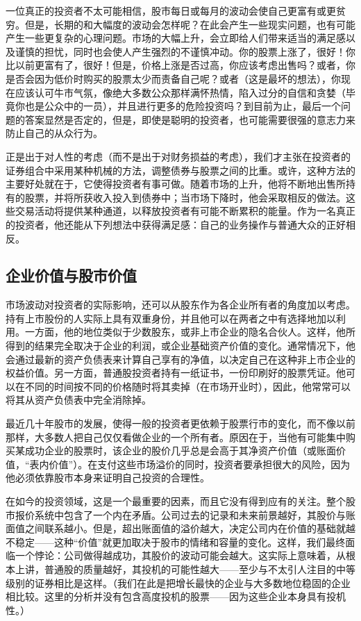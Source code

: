 \documentclass[12pt,oneside]{book}
\begin{document}
一位真正的投资者不太可能相信，股市每日或每月的波动会使自己更富有或更贫穷。但是，长期的和大幅度的波动会怎样呢？在此会产生一些现实问题，也有可能产生一些更复杂的心理问题。市场的大幅上升，会立即给人们带来适当的满足感以及谨慎的担忧，同时也会使人产生强烈的不谨慎冲动。你的股票上涨了，很好！你比以前更富有了，很好！但是，价格上涨是否过高，你应该考虑出售吗？或者，你是否会因为低价时购买的股票太少而责备自己呢？或者（这是最坏的想法），你现在应该认可牛市气氛，像绝大多数公众那样满怀热情，陷入过分的自信和贪婪（毕竟你也是公众中的一员），并且进行更多的危险投资吗？到目前为止，最后一个问题的答案显然是否定的，但是，即使是聪明的投资者，也可能需要很强的意志力来防止自己的从众行为。

正是出于对人性的考虑（而不是出于对财务损益的考虑），我们才主张在投资者的证券组合中采用某种机械的方法，调整债券与股票之间的比重。或许，这种方法的主要好处就在于，它使得投资者有事可做。随着市场的上升，他将不断地出售所持有的股票，并将所获收入投入到债券中；当市场下降时，他会采取相反的做法。这些交易活动将提供某种通道，以释放投资者有可能不断累积的能量。作为一名真正的投资者，他还能从下列想法中获得满足感：自己的业务操作与普通大众的正好相反。

\subsection{企业价值与股市价值}
市场波动对投资者的实际影响，还可以从股东作为各企业所有者的角度加以考虑。持有上市股份的人实际上具有双重身份，并且他可以在两者之中有选择地加以利用。一方面，他的地位类似于少数股东，或非上市企业的隐名合伙人。这样，他所得到的结果完全取决于企业的利润，或企业基础资产价值的变化。通常情况下，他会通过最新的资产负债表来计算自己享有的净值，以决定自己在这种非上市企业的权益价值。另一方面，普通股投资者持有一纸证书，一份印刷好的股票凭证。他可以在不同的时间按不同的价格随时将其卖掉（在市场开业时），因此，他常常可以将其从资产负债表中完全消除掉。

最近几十年股市的发展，使得一般的投资者更依赖于股票行市的变化，而不像以前那样，大多数人把自己仅仅看做企业的一个所有者。原因在于，当他有可能集中购买某成功企业的股票时，该企业的股价几乎总是会高于其净资产价值（或账面价值，“表内价值”）。在支付这些市场溢价的同时，投资者要承担很大的风险，因为他必须依靠股市本身来证明自己投资的合理性。

在如今的投资领域，这是一个最重要的因素，而且它没有得到应有的关注。整个股市报价系统中包含了一个内在矛盾。公司过去的记录和未来前景越好，其股价与账面值之间联系越小。但是，超出账面值的溢价越大，决定公司内在价值的基础就越不稳定——这种“价值”就更加取决于股市的情绪和容量的变化。这样，我们最终面临一个悖论：公司做得越成功，其股价的波动可能会越大。这实际上意味着，从根本上讲，普通股的质量越好，其投机的可能性越大——至少与不太引人注目的中等级别的证券相比是这样。（我们在此是把增长最快的企业与大多数地位稳固的企业相比较。这里的分析并没有包含高度投机的股票——因为这些企业本身具有投机性。）
\end{document}
